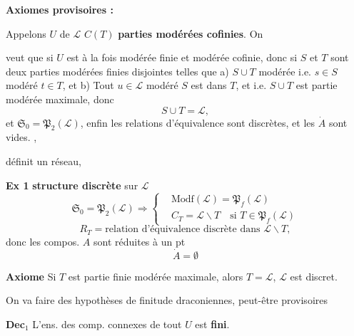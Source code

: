 \documentclass[11pt,a4paper]{article}
\begin{document}

\textbf{Axiomes provisoires :}

 Appelons  $U$ de $\mathcal{L}$  \ill{} $C(T)$ \textbf{parties modérées cofinies}. On

veut que si $U$  est à la fois modérée finie et modérée cofinie, donc si $S$ et $T$ sont deux parties modérées finies  disjointes telles que  a) $S \cup T$ modérée i.e. \ill{} $s \in S$ modéré  $t \in T$, et b) Tout $u \in \mathcal{L}$ modéré  $S$ est dans $T$,  et 
i.e. $S \cup T$ est partie  modérée maximale, donc
\[
  S \cup T = \mathcal{L},
\]
et $\mathfrak{S}_0 = \mathfrak{P}_2(\mathcal{L})$, enfin les relations d'équivalence sont discrètes, et les $\dot{A}$ sont vides.  \ill{} \ill{},

\ill{} définit un réseau, \ill{}

\textbf{Ex 1}  \textbf{structure discrète} sur $\mathcal{L}$
\[
  \mathfrak{S}_0 = \mathfrak{P}_2(\mathcal{L}) \Longrightarrow
  \left\{
  \begin{aligned}
    &\mathrm{Modf}(\mathcal{L}) = \mathfrak{P}_f(\mathcal{L}) \\
    &C_T = \mathcal{L} \smallsetminus T \quad \text{si } T \in \mathfrak{P}_f(\mathcal{L})
  \end{aligned}
  \right.
\]
\[
  R_T = \text{relation d'équivalence discrète dans } \mathcal{L} \smallsetminus T,
\]
donc les compos. $A$ sont réduites à un pt 
\[
  \dot{A} = \emptyset
\]

\textbf{Axiome} Si $T$ est partie finie modérée maximale, alors $T = \mathcal{L}$, $\mathcal{L}$ est discret.

On va faire des hypothèses de finitude draconiennes, peut-être provisoires

\textbf{Dec$_1$} L'ens. des comp. connexes de tout $U$ est \textbf{fini}.

\end{document}
